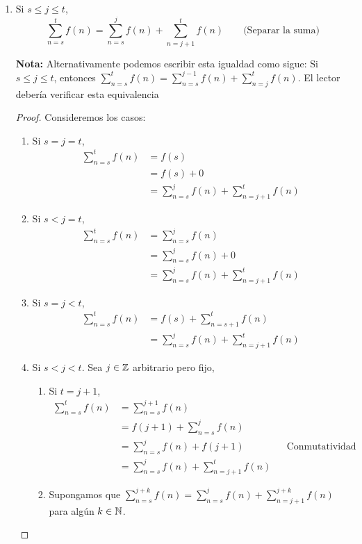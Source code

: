 \begin{enumerate}[label=\alph*)]
  \item Si $s\leq j\leq t$, \[\sum_{n=s}^{t}f(n) = \sum_{n=s}^{j}f(n) + \sum_{n=j+1}^{t}f(n) \qquad \text{(Separar la suma)}\]
  
  \textbf{Nota:} Alternativamente podemos escribir esta igualdad como sigue: Si $s\leq j\leq t$, entonces $\sum_{n=s}^{t}f(n) = \sum_{n=s}^{j-1}f(n) + \sum_{n=j}^{t}f(n)$. El lector debería verificar esta equivalencia

  \begin{proof}
    Consideremos los casos:
    \begin{enumerate}[label=\Roman*)]
      \item Si $s=j=t$,
      \begin{align*}
        \sum_{n=s}^{t}f(n) &= f(s)\\
        &= f(s) + 0\\
        &= \sum_{n=s}^{j}f(n) + \sum_{n=j+1}^{t}f(n)
      \end{align*}
      \item Si $s<j=t$,
      \begin{align*}
        \sum_{n=s}^{t}f(n) &= \sum_{n=s}^{j}f(n)\\
        &= \sum_{n=s}^{j}f(n) + 0\\
        &= \sum_{n=s}^{j}f(n) + \sum_{n=j+1}^{t}f(n)
      \end{align*}
      \item Si $s=j<t$,
      \begin{align*}
        \sum_{n=s}^{t}f(n) &= f(s) + \sum_{n=s+1}^{t}f(n)\\
        &= \sum_{n=s}^{j}f(n) + \sum_{n=j+1}^{t}f(n)
      \end{align*}
      \item Si $s<j<t$.
        Sea $j\in \mathbb{Z}$ arbitrario pero fijo,
        \begin{enumerate}[label=\roman*)]
          \item Si $t=j+1$,
          \begin{align*}
            \sum_{n=s}^{t}f(n) &=  \sum_{n=s}^{j+1}f(n)\\
            &= f(j+1) + \sum_{n=s}^{j}f(n)\\
            &= \sum_{n=s}^{j}f(n) + f(j+1) && \text{Conmutatividad}\\
            &= \sum_{n=s}^{j}f(n) + \sum_{n=j+1}^{t}f(n)
          \end{align*}
          \item Supongamos que $\sum_{n=s}^{j+k}f(n) = \sum_{n=s}^{j}f(n) + \sum_{n=j+1}^{j+k}f(n)$ para algún $k\in \mathbb{N}$.

\end{enumerate}
\end{enumerate}
\end{proof}
\end{enumerate}

